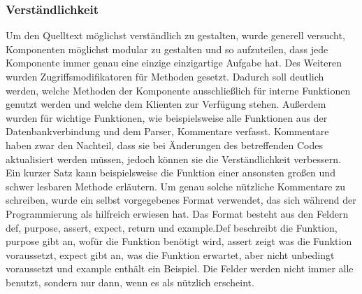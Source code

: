 \subsubsection{Verständlichkeit}
Um den Quelltext möglichst verständlich zu gestalten, wurde generell versucht, Komponenten möglichst modular zu gestalten und so aufzuteilen, dass jede Komponente immer genau eine einzige einzigartige Aufgabe hat. %
Des Weiteren wurden Zugriffsmodifikatoren für Methoden gesetzt. Dadurch soll deutlich werden, welche Methoden der Komponente ausschließlich für interne Funktionen genutzt werden und welche dem Klienten zur Verfügung stehen.%
Außerdem wurden für wichtige Funktionen, wie beispielsweise alle Funktionen aus der Datenbankverbindung und dem Parser, Kommentare verfasst. %
	Kommentare haben zwar den Nachteil, dass sie bei Änderungen des betreffenden Codes aktualisiert werden müssen, jedoch können sie die Verständlichkeit verbessern. Ein kurzer Satz kann beispielsweise die Funktion einer ansonsten großen und schwer lesbaren Methode erläutern. %
	Um genau solche nützliche Kommentare zu schreiben, wurde ein selbst vorgegebenes Format verwendet, das sich während der Programmierung als hilfreich erwiesen hat. Das Format besteht aus den Feldern \glqq def\grqq{}, \glqq purpose\grqq{}, \glqq assert\grqq{}, \glqq expect\grqq{}, \glqq return\grqq{} und \glqq example\grqq{}.\glqq Def\grqq{} beschreibt die Funktion, \glqq purpose\grqq{} gibt an, wofür die Funktion benötigt wird, \glqq assert\grqq{} zeigt was die Funktion voraussetzt, \glqq expect\grqq{} gibt an, was die Funktion erwartet, aber nicht unbedingt voraussetzt und \glqq example\grqq{} enthält ein Beispiel. Die Felder werden nicht immer alle benutzt, sondern nur dann, wenn es als nützlich erscheint.\newline%


